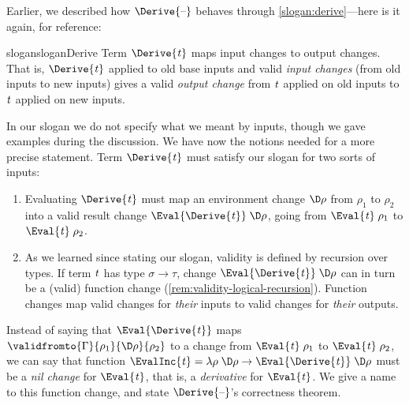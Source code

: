 Earlier, we described how \ensuremath{\Derive{\text{\textendash}}} behaves through
\cref{slogan:derive}---here is it again, for reference:
%
\begin{fullCompile}
\sloganDerive*
\end{fullCompile}
\begin{partCompile}
\begin{restatable}{slogan}{sloganDerive}
  \label{slogan:derive}
  Term \ensuremath{\Derive{\Varid{t}}} maps input changes to output changes.
  That is, \ensuremath{\Derive{\Varid{t}}} applied to old base inputs and valid \emph{input changes}
  (from old inputs to new inputs) gives a valid \emph{output change} from \ensuremath{\Varid{t}}
  applied on old inputs to \ensuremath{\Varid{t}} applied on new inputs.
\end{restatable}
\end{partCompile}
In our slogan we do not specify what we meant by inputs, though we gave examples
during the discussion. We have now the notions needed for a more precise statement.
Term \ensuremath{\Derive{\Varid{t}}} must satisfy our slogan for
two sorts of inputs:
\begin{enumerate}
\item Evaluating \ensuremath{\Derive{\Varid{t}}} must map an environment change \ensuremath{\D\rho} from
\ensuremath{\rho_{1}} to \ensuremath{\rho_{2}} into a valid result change \ensuremath{\Eval{\Derive{\Varid{t}}}\;\D\rho}, going from
\ensuremath{\Eval{\Varid{t}}\;\rho_{1}} to \ensuremath{\Eval{\Varid{t}}\;\rho_{2}}.
\item As we learned since stating our slogan, validity is defined by recursion
over types. If term \ensuremath{\Varid{t}} has type \ensuremath{\sigma\to \tau}, change \ensuremath{\Eval{\Derive{\Varid{t}}}\;\D\rho}
can in turn be a (valid) function change
(\cref{rem:validity-logical-recursion}). Function changes map valid changes for
\emph{their} inputs to valid changes for \emph{their} outputs.
\end{enumerate}

Instead of saying that \ensuremath{\Eval{\Derive{\Varid{t}}}} maps \ensuremath{\validfromto{\Gamma}{\rho_{1}}{\D\rho}{\rho_{2}}} to a
change from \ensuremath{\Eval{\Varid{t}}\;\rho_{1}} to \ensuremath{\Eval{\Varid{t}}\;\rho_{2}}, we can say that function \ensuremath{\EvalInc{\Varid{t}}\mathrel{=}\lambda \rho\;\D\rho\to \Eval{\Derive{\Varid{t}}}\;\D\rho} must be a \emph{nil change} for \ensuremath{\Eval{\Varid{t}}},
that is, a \emph{derivative} for \ensuremath{\Eval{\Varid{t}}}.
We give a name to this function change, and state \ensuremath{\Derive{\text{\textendash}}}'s correctness
theorem.

